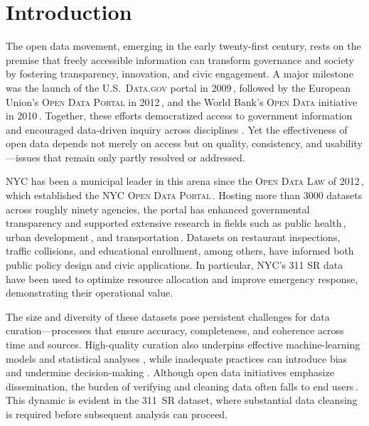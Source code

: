 \documentclass[linenumber]{jdsart}
\begin{document}
\section{Introduction}
\label{sec:intro}
The open data movement, emerging in the early twenty-first century, rests on
the premise that freely accessible information can transform governance and
society by fostering transparency, innovation, and civic engagement.
A major milestone was the launch of the U.S.\ \textsc{Data.gov} portal in
2009\,\citep{dataGov}, followed by the European Union’s
\textsc{Open Data Portal} in 2012\,\citep{dataEU}, and the World Bank’s
\textsc{Open Data} initiative in 2010\,\citep{dataWorldBank}.
Together, these efforts democratized access to government information and
encouraged data-driven inquiry across disciplines
\citep{barns2016mine,wang2016adoption}. Yet the effectiveness of open data
depends not merely on access but on quality, consistency, and usability—issues
that remain only partly resolved or addressed.

NYC has been a municipal leader in this arena since the
\textsc{Open Data Law} of 2012\,\citep{zuiderwijk2014open}, which established
the \textsc{NYC Open Data Portal}\,\citep{dataNYC}.
Hosting more than \num[round-mode=none, group-minimum-digits=5]{3000}
datasets across roughly ninety agencies, the portal
has enhanced governmental transparency and supported extensive research in
fields such as public health\,\citep{cantor2018facets,shankar2021data}, urban
development\,\citep{neves2020impacts}, and transportation\,\citep{gerte2019understanding}.
Datasets on restaurant inspections, traffic collisions, and educational
enrollment, among others, have informed both public policy design and civic
applications. In particular, NYC’s 311 SR data have
been used to optimize resource allocation and improve emergency response,
demonstrating their operational value.

The size and diversity of these datasets pose persistent challenges
for data curation—processes that ensure accuracy, completeness, and
coherence across time and sources. High-quality curation also underpins
effective machine-learning models and statistical analyses
\citep{polyzotis2019data,jain2020overview}, while inadequate practices can
introduce bias and undermine decision-making
\citep{geiger2020garbage,rahm2000data}. Although open data initiatives
emphasize dissemination, the burden of verifying and cleaning data often falls
to end users\,\citep{cody2017cody,van2018statistical}. This dynamic is evident
in the 311~SR dataset, where substantial data cleansing is required before
subsequent analysis can proceed.
\end{document}

